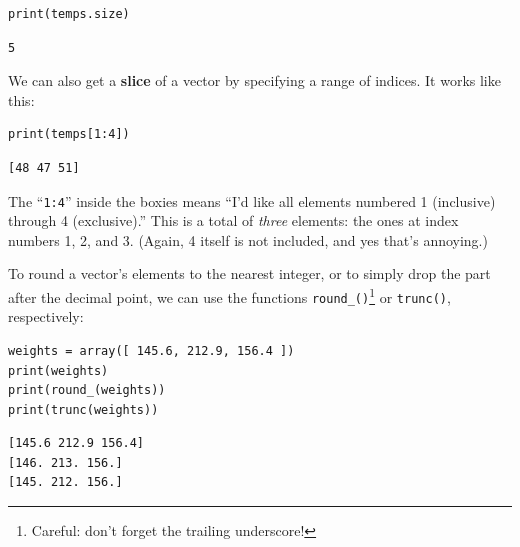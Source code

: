 \begin{Verbatim}[fontsize=\small,samepage=true,frame=single,framesep=3mm]
print(temps.size)
\end{Verbatim}
\vspace{-.2in}

\begin{Verbatim}[fontsize=\small,samepage=true,frame=leftline,framesep=5mm,framerule=1mm]
5
\end{Verbatim}

\label{slice}

We can also get a \textbf{slice} of a vector by specifying a range of indices.
It works like this:

\begin{Verbatim}[fontsize=\small,samepage=true,frame=single,framesep=3mm]
print(temps[1:4])
\end{Verbatim}
\vspace{-.2in}

\begin{Verbatim}[fontsize=\small,samepage=true,frame=leftline,framesep=5mm,framerule=1mm]
[48 47 51]
\end{Verbatim}

The ``\texttt{1:4}'' inside the boxies means ``I'd like all elements numbered 1
(inclusive) through 4 (exclusive).'' This is a total of \textit{three}
elements: the ones at index numbers 1, 2, and 3. (Again, 4 itself is not
included, and yes that's annoying.)

\medskip
{}

To round a vector's elements to the nearest integer, or to simply drop the part
after the decimal point, we can use the functions
\texttt{round\_()}\footnote{Careful: don't forget the trailing underscore!} or
\texttt{trunc()}, respectively:

\begin{Verbatim}[fontsize=\small,samepage=true,frame=single,framesep=3mm]
weights = array([ 145.6, 212.9, 156.4 ])
print(weights)
print(round_(weights))
print(trunc(weights))
\end{Verbatim}
\vspace{-.2in}

\begin{Verbatim}[fontsize=\small,samepage=true,frame=leftline,framesep=5mm,framerule=1mm]
[145.6 212.9 156.4]
[146. 213. 156.]
[145. 212. 156.]
\end{Verbatim}

